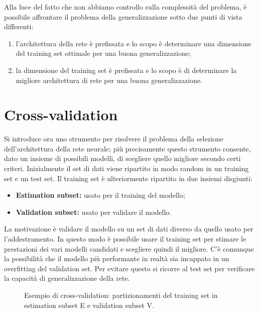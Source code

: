 \newpage

Alla luce del fatto che non abbiamo controllo sulla complessità del problema, è possibile affrontare il problema della generalizzazione sotto due punti di vista differenti:
\begin{enumerate}
    \item l'architettura della rete è prefissata e lo scopo è determinare una dimensione del training set ottimale per una buona generalizzazione;
    \item la dimensione del training set è prefissata e lo scopo è di determinare la migliore architettura di rete per una buona generalizzazione.
\end{enumerate}



\section{Cross-validation} %
\label{sec:cross_validation}
Si introduce ora uno strumento per risolvere il problema della selezione dell’architettura della rete neurale; più precisamente questo strumento consente, dato un insieme di possibili modelli, di scegliere quello migliore secondo certi criteri.
Inizialmente il set di dati viene ripartito in modo random in un training set e un test set. Il training set è ulteriormente ripartito in due insiemi disgiunti:
\begin{itemize}
    \item \textbf{Estimation subset:} usato per il training del modello;
    \item \textbf{Validation subset:} usato per validare il modello.
\end{itemize}
La motivazione è validare il modello su un set di dati diverso da quello usato per l'addestramento. In questo modo è possibile usare il training set per stimare le prestazioni dei vari modelli candidati e scegliere quindi il migliore. C'è comunque la possibilità che il modello più performante in realtà sia incappato in un overfitting del validation set. Per evitare questo si ricorre al test set per verificare la capacità di generalizzazione della rete.

\newpage

\begin{figure}[h!]
    \centering
\caption{Esempio di cross-validation: partizionamenti del training set in estimation subset E e validation subset V.}
\end{figure}


